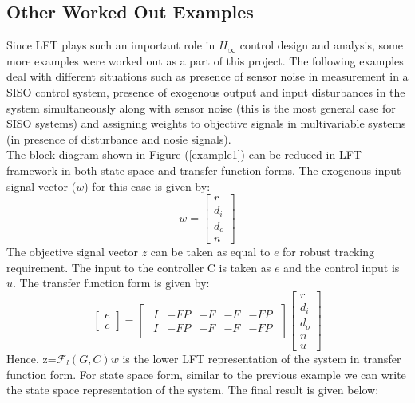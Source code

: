 \documentclass[a4paper,12pt]{article}
\begin{document}
			\subsection{Other Worked Out Examples} Since LFT plays such an important role in $H_{\infty}$ control design and analysis, some more examples were worked out as a part of this project. The following examples deal with different situations such as presence of sensor noise in measurement in a SISO control system, presence of exogenous output and input disturbances in the system simultaneously along with sensor noise (this is the most general case for SISO systems) and assigning weights to objective signals in multivariable systems (in presence of disturbance and nosie signals). 
			\\The block diagram shown in Figure (\ref{example1}) can be reduced in LFT framework in both state space and transfer function forms. The exogenous input signal vector ($w$) for this case is given by:
			\[w=
			\begin{bmatrix}
			r \\ d_{i} \\ d_{o} \\ n
			\end{bmatrix}
			\]
			The objective signal vector $z$ can be taken as equal to $e$ for robust tracking requirement. The input to the controller C is taken as $e$ and the control input is $u$. The transfer function form is given by:
			\[
			\begin{bmatrix}
			e \\ \hline e
			\end{bmatrix}
			=
			\begin{bmatrix}
				\begin{array}{cccc|c}
				I & -FP & -F & -F & -FP\\ \hline
				I & -FP & -F & -F & -FP
				\end{array}
			\end{bmatrix}
			\begin{bmatrix}
			r \\ d_{i} \\ d_{o} \\ n \\ \hline u
			\end{bmatrix}
			\]
			Hence, z=$\mathscr{F}_{l}(G,C)w$ is the lower LFT representation of the system in transfer function form. For state space form, similar to the previous example we can write the state space representation of the system. The final result is given below: 
\end{document}
